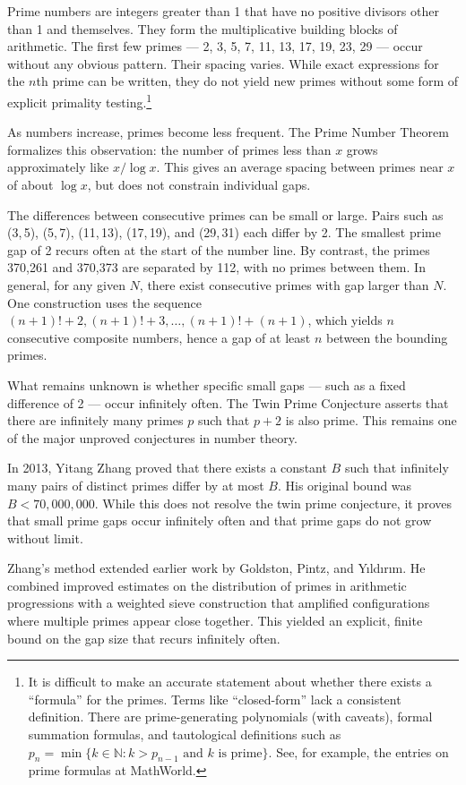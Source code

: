 Prime numbers are integers greater than 1 that have no positive divisors other than 1 and themselves. They form the multiplicative building blocks of arithmetic. The first few primes — 2, 3, 5, 7, 11, 13, 17, 19, 23, 29 — occur without any obvious pattern. Their spacing varies. While exact expressions for the $n$th prime can be written, they do not yield new primes without some form of explicit primality testing.\footnote{It is difficult to make an accurate statement about whether there exists a “formula” for the primes. Terms like “closed-form” lack a consistent definition. There are prime-generating polynomials (with caveats), formal summation formulas, and tautological definitions such as $p_n = \min\{k \in \mathbb{N} : k > p_{n-1} \text{ and } k \text{ is prime}\}$. See, for example, the entries on prime formulas at MathWorld.}


As numbers increase, primes become less frequent. The Prime Number Theorem formalizes this observation: the number of primes less than $x$ grows approximately like $x / \log x$. This gives an average spacing between primes near $x$ of about $\log x$, but does not constrain individual gaps.

The differences between consecutive primes can be small or large. Pairs such as (3, 5), (5, 7), (11, 13), (17, 19), and (29, 31) each differ by 2. The smallest prime gap of 2 recurs often at the start of the number line. By contrast, the primes 370,261 and 370,373 are separated by 112, with no primes between them. In general, for any given $N$, there exist consecutive primes with gap larger than $N$. One construction uses the sequence $
(n+1)! + 2,  (n+1)! + 3,  \dots,  (n+1)! + (n+1)$, which yields $n$ consecutive composite numbers, hence a gap of at least $n$ between the bounding primes.

What remains unknown is whether specific small gaps — such as a fixed difference of 2 — occur infinitely often. The Twin Prime Conjecture asserts that there are infinitely many primes $p$ such that $p + 2$ is also prime. This remains one of the major unproved conjectures in number theory.

In 2013, Yitang Zhang proved that there exists a constant $B$ such that infinitely many pairs of distinct primes differ by at most $B$. His original bound was $B < 70{,}000{,}000$. While this does not resolve the twin prime conjecture, it proves that small prime gaps occur infinitely often and that prime gaps do not grow without limit.

Zhang's method extended earlier work by Goldston, Pintz, and Yıldırım. He combined improved estimates on the distribution of primes in arithmetic progressions with a weighted sieve construction that amplified configurations where multiple primes appear close together. This yielded an explicit, finite bound on the gap size that recurs infinitely often.

